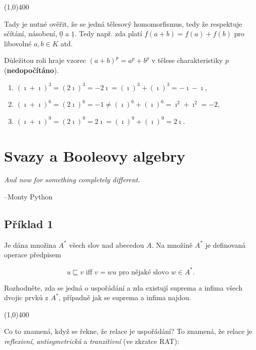 \documentclass{article}
\begin{document}
\line(1,0){400}

Tady je nutné ověřit, že se jedná tělesový homomorfismus, tedy že respektuje sčítání, násobení, $\underline{0}$ a $\underline{1}$. Tedy např. zda platí $f(a+b) = f(a) + f(b)$ pro libovolné $a,b \in K$ atd.

Důležitou roli hraje vzorec $(a+b)^p = a^p+b^p$ v tělese charakteristiky $p$ (\textbf{nedopočítáno}).

\begin{enumerate}
	\item $(\imath + \imath)^3 = (2\imath)^3 = -2\imath = (\imath)^3 + (\imath)^3 = -\imath - \imath$,
	\item $(\imath + \imath)^6 = (2\imath)^6 = -1 \neq (\imath)^6 + (\imath)^6 =  \imath^2 + \imath^2 = -2$,
	\item $(\imath + \imath)^9 = (2\imath)^9 = 2\imath = (\imath)^9 + (\imath)^9 = 2\imath$.
\end{enumerate}


\clearpage

\section{Svazy a Booleovy algebry}

\begin{flushright}
\parbox[h]{3in}{
\emph{And now for something completely different.}
}
\begin{flushright}
--Monty Python
\end{flushright}

\end{flushright}

\subsection{Příklad 1}
Je dána množina $A^*$ všech slov nad abecedou $A$. Na množině $A^*$ je definovaná operace předpisem

\[ u \sqsubseteq v \text{ iff } v = wu \text{ pro nějaké slovo } w \in A^*. \]

Rozhodněte, zda se jedná o uspořádání a zda existují suprema a infima všech dvojic prvků z $A^*$, případně jak se suprema a infima najdou.
 
\line(1,0){400}

Co to znamená, když se řekne, že relace je uspořádání? To znamená, že relace je \emph{reflexivní}, \emph{antisymetrická} a \emph{tranzitivní} (ve zkratce \textsc{RAT}):
\end{document}

